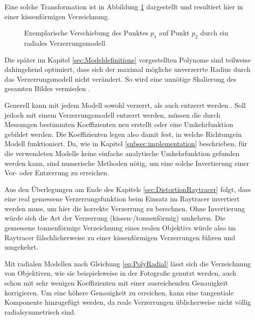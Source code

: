 Eine solche Transformation ist in Abbildung \ref{fig:DistExample} dargestellt und resultiert hier in einer kissenförmigen Verzeichnung.

\begin{figure}[h]
	\centering
	
	\caption{Exemplarische Verschiebung des Punktes $p_1$ auf Punkt $p_2$ durch ein radiales Verzerrungsmodell}
	\label{fig:DistExample}
\end{figure}

Die später im Kapitel \ref{sec:Modeldefinitions} vorgestellten Polynome sind teilweise dahingehend optimiert, dass sich der maximal mögliche unverzerrte Radius durch das Verzerrungsmodell nicht verändert. So wird eine unnötige Skalierung des gesamten Bildes vermieden \cite{ScalePreservingLensDistortion}.

Generell kann mit jedem Modell sowohl verzerrt, als auch entzerrt werden \cite{TangDistortionModels}. Soll jedoch mit einem Verzerrungsmodell entzerrt werden, müssen die durch Messungen bestimmten Koeffizienten neu erstellt oder eine Umkehrfunktion gebildet werden. Die Koeffizienten legen also damit fest, in welche \glqq Richtung\grqq{ }ein Modell funktioniert. Da, wie in Kapitel \ref{subsec:implementation} beschrieben, für die verwendeten Modelle keine einfache analytische Umkehrfunktion gefunden werden kann, sind numerische Methoden nötig, um eine solche Invertierung einer Ver- oder Entzerrung zu erreichen. 

Aus den Überlegungen am Ende des Kapitels \ref{sec:DistortionRaytracer} folgt, dass eine real gemessene Verzerrungsfunktion beim Einsatz im Raytracer invertiert werden muss, um hier die korrekte Verzerrung zu berechnen. Ohne Invertierung würde sich die Art der Verzerrung (kissen-/tonnenförmig) umkehren. Die gemessene tonnenförmige Verzeichnung eines realen Objektivs würde also im Raytracer fälschlicherweise zu einer kissenförmigen Verzerrungen führen und umgekehrt.

Mit radialen Modellen nach Gleichung \ref{eq:PolyRadial} lässt sich die Verzeichnung von Objektiven, wie sie beispielsweise in der Fotografie genutzt werden, auch schon mit sehr wenigen Koeffizienten mit einer ausreichenden Genauigkeit korrigieren. Um eine höhere Genauigkeit zu erreichen, kann eine tangentiale Komponente hinzugefügt werden, da reale Verzerrungen üblicherweise nicht völlig radialsymmetrisch sind.